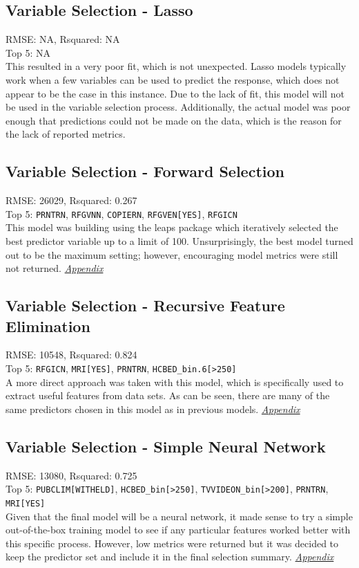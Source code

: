 \subsection{Variable Selection - Lasso}
RMSE: NA, Rsquared: NA\\
 Top 5: NA
\\[0.1in]
\indent This resulted in a very poor fit, which is not unexpected.  Lasso models typically work when a few variables can be used to predict the response, which does not appear to be the case in this instance.  Due to the lack of fit, this model will not be used in the variable selection process.  Additionally, the actual model was poor enough that predictions could not be made on the data, which is the reason for the lack of reported metrics.

\subsection{Variable Selection - Forward Selection}
RMSE: 26029, Rsquared: 0.267\\
Top 5: \lstinline{PRNTRN}, \lstinline{RFGVNN}, \lstinline{COPIERN}, \lstinline{RFGVEN[YES]}, \lstinline{RFGICN}
\\[0.1in]
\indent This model was building using the leaps package which iteratively selected the best predictor variable up to a limit of 100.  Unsurprisingly, the best model turned out to be the maximum setting; however, encouraging model metrics were still not returned.  \textit{\hyperref[appendix:electricity:lp]{Appendix}}

\subsection{Variable Selection - Recursive Feature Elimination}
RMSE: 10548, Rsquared: 0.824\\
Top 5: \lstinline{RFGICN}, \lstinline{MRI[YES]}, \lstinline{PRNTRN}, \lstinline{HCBED_bin.6[>250]}
\\[0.1in]
\indent A more direct approach was taken with this model, which is specifically used to extract useful features from data sets.  As can be seen, there are many of the same predictors chosen in this model as in previous models.  \textit{\hyperref[appendix:electricity:rfe]{Appendix}}

\subsection{Variable Selection - Simple Neural Network}
RMSE: 13080, Rsquared: 0.725\\
Top 5: \lstinline{PUBCLIM[WITHELD]}, \lstinline{HCBED_bin[>250]}, \lstinline{TVVIDEON_bin[>200]}, \lstinline{PRNTRN}, \lstinline{MRI[YES]}
\\[0.1in]
\indent Given that the final model will be a neural network, it made sense to try a simple out-of-the-box training model to see if any particular features worked better with this specific process.  However, low metrics were returned but it was decided to keep the predictor set and include it in the final selection summary.  \textit{\hyperref[appendix:electricity:snn]{Appendix}}
\newpage
